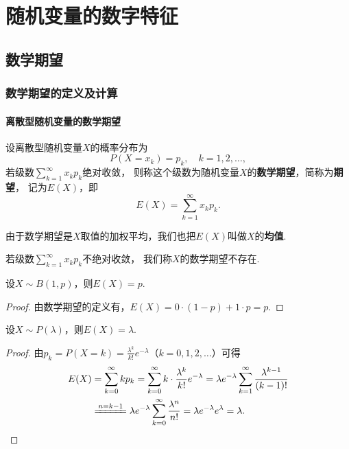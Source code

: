 \chapter{随机变量的数字特征}
\section{数学期望}
\subsection{数学期望的定义及计算}
\subsubsection{离散型随机变量的数学期望}
\begin{definition}
设离散型随机变量\(X\)的概率分布为\[
P(X=x_k) = p_k, \quad k=1,2,\dotsc,
\]若级数\(\sum\limits_{k=1}^\infty {x_k p_k}\)绝对收敛，%
则称这个级数为随机变量\(X\)的\textbf{数学期望}，简称为\textbf{期望}，%
记为\(E(X)\)，即\begin{equation}\label{equation:随机变量的数字特征.数学期望的定义式}
E(X) = \sum\limits_{k=1}^\infty x_k p_k.
\end{equation}

由于数学期望是\(X\)取值的加权平均，我们也把\(E(X)\)叫做\(X\)的\textbf{均值}.

若级数\(\sum\limits_{k=1}^\infty x_k p_k\)不绝对收敛，%
我们称\(X\)的数学期望不存在.
\end{definition}

\begin{theorem}\label{theorem:随机变量的数字特征.0-1分布的数学期望}
设\(X \sim B(1,p)\)，则\(E(X) = p\).
\begin{proof}
由数学期望的定义有，\(E(X) = 0 \cdot (1-p) + 1 \cdot p = p\).
\end{proof}
\end{theorem}

\begin{theorem}\label{theorem:随机变量的数字特征.泊松分布的数学期望}
设\(X \sim P(\lambda)\)，则\(E(X) = \lambda\).
\begin{proof}
由\(p_k = P(X=k) = \frac{\lambda^k}{k!} e^{-\lambda}\)（\(k=0,1,2,\dotsc\)）可得
\begin{align*}
E(X) &= \sum\limits_{k=0}^\infty {k p_k}
= \sum\limits_{k=0}^\infty {k \cdot \frac{\lambda^k}{k!} e^{-\lambda}}
= \lambda e^{-\lambda} \sum\limits_{k=1}^\infty {\frac{\lambda^{k-1}}{(k-1)!}} \\
&\xlongequal{n=k-1} \lambda e^{-\lambda} \sum\limits_{k=0}^\infty {\frac{\lambda^{n}}{n!}}
= \lambda e^{-\lambda} e^{\lambda} = \lambda.
\qedhere
\end{align*}
\end{proof}
\end{theorem}

